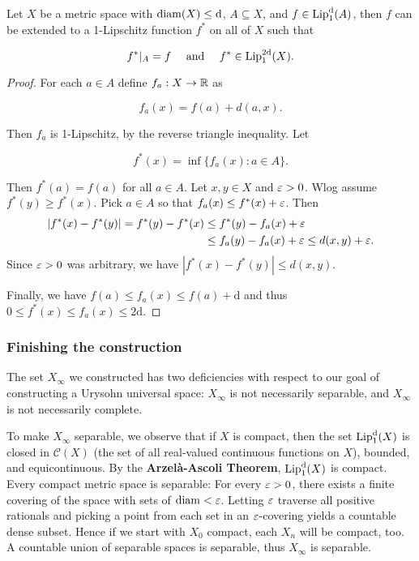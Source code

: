 \begin{lemma}Let $X$ be a metric space with $\mathrm{diam}(X) \leq \mathrm d$, $A \subseteq X$, and $f \in \operatorname{Lip}^{\mathrm{d}}_1(A)$, then $f$ can be extended to a 1-Lipschitz function $f^*$ on all of $X$ such that

\begin{equation}
f^*|_A = f \quad \text{ and } \quad f^* \in \operatorname{Lip}^{2\mathrm{d}}_1(X).
\end{equation}

\end{lemma}\begin{proof}For each $a \in A$ define $f_a: X \to \mathbb{R}$ as

\begin{equation}
f_a(x) = f(a) + d(a,x).
\end{equation}

Then $f_a$ is 1-Lipschitz, by the reverse triangle inequality. Let

\begin{equation}
f^*(x) = \inf \{f_a(x) \colon a \in A\}.
\end{equation}

Then $f^*(a) = f(a)$ for all $a \in A$. Let $x,y \in X$ and $\varepsilon > 0$. Wlog assume $f^*(y) \geq f^*(x)$. Pick $a \in A$ so that $f_a(x) \leq f^*(x)   + \varepsilon$. Then
\begin{align*}
	|f^*(x) - f^*(y)| = f^*(y) - f^*(x) & \leq f^*(y) - f_a(x) + \varepsilon \\
		& \leq f_a(y) - f_a(x) + \varepsilon \leq d(x,y) + \varepsilon.
\end{align*}
Since $\varepsilon > 0$ was arbitrary, we have $|f^*(x) - f^*(y)| \leq d(x,y)$.

Finally, we have $f(a) \leq f_a(x) \leq f(a) + \mathrm{d}$ and thus $0 \leq f^*(x) \leq f_a(x) \leq 2\mathrm{d}$.

\end{proof}\subsubsection{Finishing the construction}\label{ury-finishing-construction}

The set $X_\infty$ we constructed has two deficiencies with respect to our goal of constructing a Urysohn universal space: $X_\infty$ is not necessarily separable, and $X_\infty$ is not necessarily complete.

To make $X_\infty$ separable, we observe that if $X$ is compact, then the set $\operatorname{Lip}^{\mathrm{d}}_1(X)$ is closed in $\mathcal{C}(X)$ (the set of all real-valued continuous functions on $X$), bounded, and equicontinuous. By the \textbf{Arzelà-Ascoli Theorem}, $\operatorname{Lip}^{\mathrm{d}}_1(X)$ is compact.
Every compact metric space is separable: For every $\varepsilon > 0$, there exists a finite covering of the space with sets of $\mathrm{diam} < \varepsilon$. Letting $\varepsilon$ traverse all positive rationals and picking a point from each set in an $\varepsilon$-covering yields a countable dense subset. Hence if we start with $X_0$ compact, each $X_n$ will be compact, too. A countable union of separable spaces is separable, thus $X_\infty$ is separable.

